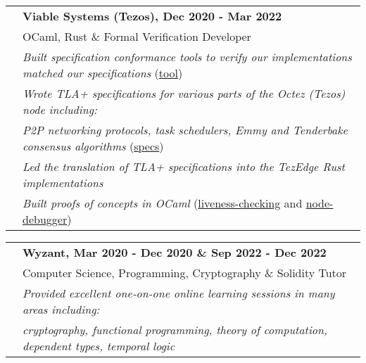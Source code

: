 \documentclass[letterpaper,10pt,oneside]{article}
\begin{document}
\noindent \begin{tabular}{@{} l l}
 \hspace{1.1in} & \textbf{Viable Systems (Tezos), Dec 2020 - Mar 2022} \\
 & OCaml, Rust \& Formal Verification Developer \\
 & \emph{Built specification conformance tools to verify our implementations matched our specifications} (\href{https://github.com/Isaac-DeFrain?tab=repositories&q=&type=&language=tla&sort=}{tool}) \\
 & \emph{Wrote TLA+ specifications for various parts of the Octez (Tezos) node including:} \\
 & \emph{P2P networking protocols, task schedulers, Emmy and Tenderbake consensus algorithms} (\href{https://github.com/tezedge/tezedge-specification}{specs}) \\
 & \emph{Led the translation of TLA+ specifications into the TezEdge Rust implementations} \\
 & \emph{Built proofs of concepts in OCaml} (\href{https://github.com/Isaac-DeFrain/liveness-checking}{liveness-checking} and \href{https://github.com/Isaac-DeFrain/node-debugger}{node-debugger}) \\
\end{tabular}

\vfill



\noindent \begin{tabular}{@{} l l}
 \hspace{1.1in} & \textbf{Wyzant, Mar 2020 - Dec 2020 \& Sep 2022 - Dec 2022} \\
 & Computer Science, Programming, Cryptography \& Solidity Tutor \\
 & \emph{Provided excellent one-on-one online learning sessions in many areas including:} \\
 & \emph{cryptography, functional programming, theory of computation, dependent types, temporal logic} \\
\end{tabular}
\end{document}
